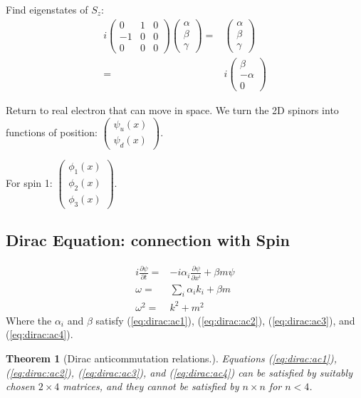 \documentclass[]{article}
\newtheorem{thm}{Theorem}
\begin{document}
Find eigenstates of $S_z$:
\begin{align*}
	i \begin{pmatrix}
		0&1&0\\
		-1&0&0\\
		0&0&0
	\end{pmatrix}\begin{pmatrix}
		\alpha\\
		\beta\\
		\gamma
	\end{pmatrix}=&\begin{pmatrix}
		\alpha\\
		\beta\\
		\gamma
	\end{pmatrix}\\
	=&i\begin{pmatrix}
		\beta\\
		-\alpha\\
		0
	\end{pmatrix}
\end{align*}

Return to real electron that can move in space. We turn the 2D spinors into functions of position: $\begin{pmatrix}
\psi_u(x)\\
\psi_d(x)
\end{pmatrix}$.

For spin 1: $\begin{pmatrix}
\phi_1(x)\\
\phi_2(x)\\
\phi_3(x)
\end{pmatrix}$.

\subsection{Dirac Equation: connection with Spin}

\begin{align*}
i \frac{\partial \psi}{\partial t} =& - i \alpha_i \frac{\partial \psi}{\partial x^i} + \beta m \psi\\
\omega =& \sum_i \alpha_i k_i + \beta m\\
\omega^2 =& k^2 + m^2
\end{align*}
Where the $\alpha_i$ and $\beta$ satisfy (\ref{eq:dirac:ac1}), (\ref{eq:dirac:ac2}), (\ref{eq:dirac:ac3}), and (\ref{eq:dirac:ac4}).


\begin{thm}[Dirac anticommutation relations.]\label{thm:dirac:anticommutation} 
	Equations (\ref{eq:dirac:ac1}), (\ref{eq:dirac:ac2}), (\ref{eq:dirac:ac3}), and (\ref{eq:dirac:ac4}) can be satisfied by suitably chosen $2\times4$ matrices, and they cannot be satisfied by $n \times n$ for $n<4$.
\end{thm}
\end{document}
